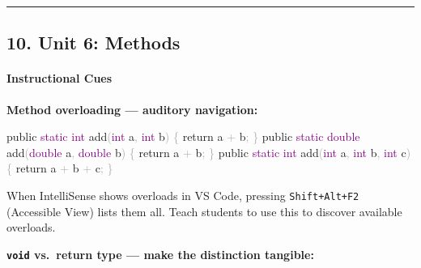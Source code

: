 \documentclass[
  justified,
  openright,
]{tufte-book}
\let\paragraph\paragraph
\newcommand{\ControlFlowTok}[1]{\textcolor{BrandBlue}{#1}}
\newcommand{\DataTypeTok}[1]{\textcolor{Purple}{#1}}
\newcommand{\FunctionTok}[1]{\textcolor{BrandBlue}{#1}}
\newcommand{\KeywordTok}[1]{\textcolor{BrandBlue}{#1}}
\newcommand{\NormalTok}[1]{#1}
\newcommand{\OperatorTok}[1]{\textcolor{DarkGray}{#1}}
\newenvironment{Shaded}{%
  \begin{snugshade}
}{%
  \end{snugshade}
}
\let\paragraph\paragraph
\begin{document}
\begin{center}\rule{0.5\linewidth}{0.5pt}\end{center}

\subsection{10. Unit 6: Methods}\label{unit-6-methods}

\paragraph{Instructional Cues}\label{instructional-cues-8}

\textbf{Method overloading --- auditory navigation:}

\begin{Shaded}
\begin{Highlighting}[]
\KeywordTok{public} \DataTypeTok{static} \DataTypeTok{int} \FunctionTok{add}\OperatorTok{(}\DataTypeTok{int}\NormalTok{ a}\OperatorTok{,} \DataTypeTok{int}\NormalTok{ b}\OperatorTok{)} \OperatorTok{\{} \ControlFlowTok{return}\NormalTok{ a }\OperatorTok{+}\NormalTok{ b}\OperatorTok{;} \OperatorTok{\}}
\KeywordTok{public} \DataTypeTok{static} \DataTypeTok{double} \FunctionTok{add}\OperatorTok{(}\DataTypeTok{double}\NormalTok{ a}\OperatorTok{,} \DataTypeTok{double}\NormalTok{ b}\OperatorTok{)} \OperatorTok{\{} \ControlFlowTok{return}\NormalTok{ a }\OperatorTok{+}\NormalTok{ b}\OperatorTok{;} \OperatorTok{\}}
\KeywordTok{public} \DataTypeTok{static} \DataTypeTok{int} \FunctionTok{add}\OperatorTok{(}\DataTypeTok{int}\NormalTok{ a}\OperatorTok{,} \DataTypeTok{int}\NormalTok{ b}\OperatorTok{,} \DataTypeTok{int}\NormalTok{ c}\OperatorTok{)} \OperatorTok{\{} \ControlFlowTok{return}\NormalTok{ a }\OperatorTok{+}\NormalTok{ b }\OperatorTok{+}\NormalTok{ c}\OperatorTok{;} \OperatorTok{\}}
\end{Highlighting}
\end{Shaded}

When IntelliSense shows overloads in VS Code, pressing
\texttt{Shift+Alt+F2} (Accessible View) lists them all. Teach students
to use this to discover available overloads.

\textbf{\texttt{void} vs.~return type --- make the distinction
tangible:}
\end{document}
